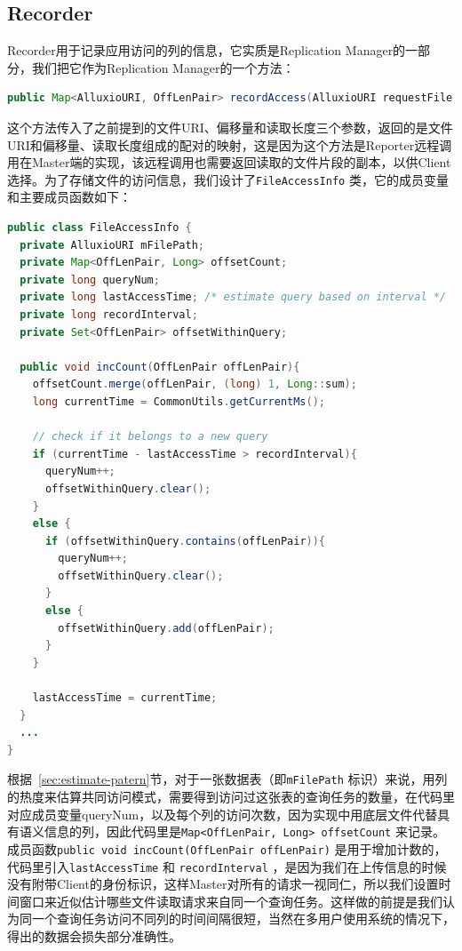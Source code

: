 \subsection{Recorder}
\label{subsec:impl-recorder}

\par Recorder用于记录应用访问的列的信息，它实质是Replication Manager的一部分，我们把它作为Replication Manager的一个方法：

\begin{lstlisting}[language=java]
  public Map<AlluxioURI, OffLenPair> recordAccess(AlluxioURI requestFile, long offset, long length);
\end{lstlisting}

\par 这个方法传入了之前提到的文件URI、偏移量和读取长度三个参数，返回的是文件URI和偏移量、读取长度组成的配对的映射，这是因为这个方法是Reporter远程调用在Master端的实现，该远程调用也需要返回读取的文件片段的副本，以供Client选择。为了存储文件的访问信息，我们设计了\verb|FileAccessInfo| 类，它的成员变量和主要成员函数如下：

\begin{lstlisting}[language=java]
public class FileAccessInfo {
  private AlluxioURI mFilePath;
  private Map<OffLenPair, Long> offsetCount;
  private long queryNum;
  private long lastAccessTime; /* estimate query based on interval */
  private long recordInterval;
  private Set<OffLenPair> offsetWithinQuery;

  public void incCount(OffLenPair offLenPair){
    offsetCount.merge(offLenPair, (long) 1, Long::sum);
    long currentTime = CommonUtils.getCurrentMs();

    // check if it belongs to a new query
    if (currentTime - lastAccessTime > recordInterval){
      queryNum++;
      offsetWithinQuery.clear();
    }
    else {
      if (offsetWithinQuery.contains(offLenPair)){
        queryNum++;
        offsetWithinQuery.clear();
      }
      else {
        offsetWithinQuery.add(offLenPair);
      }
    }

    lastAccessTime = currentTime;
  }
  ...
}
\end{lstlisting}

\par 根据~\ref{sec:estimate-patern}节，对于一张数据表（即\verb|mFilePath| 标识）来说，用列的热度来估算共同访问模式，需要得到访问过这张表的查询任务的数量，在代码里对应成员变量queryNum，以及每个列的访问次数，因为实现中用底层文件代替具有语义信息的列，因此代码里是\verb|Map<OffLenPair, Long> offsetCount| 来记录。成员函数\verb|public void incCount(OffLenPair offLenPair)| 是用于增加计数的，代码里引入\verb|lastAccessTime| 和 \verb|recordInterval| ，是因为我们在上传信息的时候没有附带Client的身份标识，这样Master对所有的请求一视同仁，所以我们设置时间窗口来近似估计哪些文件读取请求来自同一个查询任务。这样做的前提是我们认为同一个查询任务访问不同列的时间间隔很短，当然在多用户使用系统的情况下，得出的数据会损失部分准确性。

